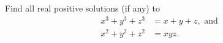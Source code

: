 Find all real positive solutions (if any) to\begin{align*}
x^3+y^3+z^3 &= x+y+z, \mbox{ and}  \\
x^2+y^2+z^2 &= xyz. 
\end{align*}
